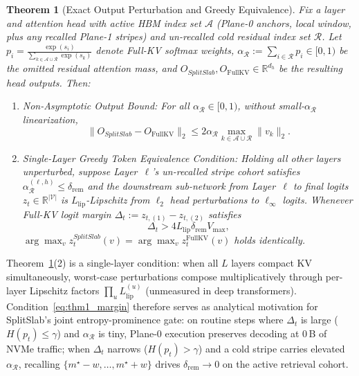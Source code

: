 \documentclass[final,5p,times,twocolumn]{elsarticle}
\newtheorem{theorem}{Theorem}
\theoremstyle{definition}
\theoremstyle{remark}
\newcommand{\SplitSlab}{\textup{\textsc{SplitSlab}}}
\newcommand{\R}{\mathbb{R}}
\def\SplitSlab{SplitSlab}%
\begin{document}
\begin{theorem}[Exact Output Perturbation and Greedy Equivalence]\label{thm:perturbation}
Fix a layer and attention head with active HBM index set $\mathcal{A}$ (Plane-0 anchors, local window, plus any recalled Plane-1 stripes) and un-recalled cold residual index set $\mathcal{R}$. Let $p_i = \frac{\exp(s_i)}{\sum_{k \in \mathcal{A} \cup \mathcal{R}} \exp(s_k)}$ denote Full-KV softmax weights, $\alpha_{\mathcal{R}} := \sum_{i \in \mathcal{R}} p_i \in [0, 1)$ be the omitted residual attention mass, and $O_{\SplitSlab}, O_{\mathrm{FullKV}} \in \R^{d_h}$ be the resulting head outputs. Then:
\begin{enumerate}
  \item \emph{Non-Asymptotic Output Bound:} For all $\alpha_{\mathcal{R}} \in [0, 1)$, without small-$\alpha_{\mathcal{R}}$ linearization,
  \begin{equation}\label{eq:thm1_l2}
  \|O_{\SplitSlab} - O_{\mathrm{FullKV}}\|_2 \le 2 \alpha_{\mathcal{R}} \max_{k \in \mathcal{A} \cup \mathcal{R}} \|v_k\|_2.
  \end{equation}
  \item \emph{Single-Layer Greedy Token Equivalence Condition:} Holding all other layers unperturbed, suppose Layer~$\ell$'s un-recalled stripe cohort satisfies $\alpha_{\mathcal{R}}^{(\ell,h)} \le \delta_{\mathrm{rem}}$ and the downstream sub-network from Layer~$\ell$ to final logits $z_t \in \R^{|\mathcal{V}|}$ is $L_{\mathrm{lip}}$-Lipschitz from $\ell_2$ head perturbations to $\ell_\infty$ logits. Whenever Full-KV logit margin $\Delta_t := z_{t,(1)} - z_{t,(2)}$ satisfies
  \begin{equation}\label{eq:thm1_margin}
  \Delta_t > 4 L_{\mathrm{lip}} \delta_{\mathrm{rem}} V_{\max},
  \end{equation}
  $\arg\max_v z_t^{\SplitSlab}(v) = \arg\max_v z_t^{\mathrm{FullKV}}(v)$ holds identically.
\end{enumerate}
\end{theorem}

Theorem~\ref{thm:perturbation}(2) is a single-layer condition: when all $L$ layers compact KV simultaneously, worst-case perturbations compose multiplicatively through per-layer Lipschitz factors $\prod_{u} L_{\mathrm{lip}}^{(u)}$ (unmeasured in deep transformers). Condition~\eqref{eq:thm1_margin} therefore serves as analytical motivation for \SplitSlab{}'s joint entropy-prominence gate: on routine steps where $\Delta_t$ is large ($H(p_t) \le \gamma$) and $\alpha_{\mathcal{R}}$ is tiny, Plane-0 execution preserves decoding at $0$\,B of NVMe traffic; when $\Delta_t$ narrows ($H(p_t) > \gamma$) and a cold stripe carries elevated $\alpha_{\mathcal{R}}$, recalling $\{m^\star - w,\dots,m^\star + w\}$ drives $\delta_{\mathrm{rem}} \to 0$ on the active retrieval cohort.
\end{document}
